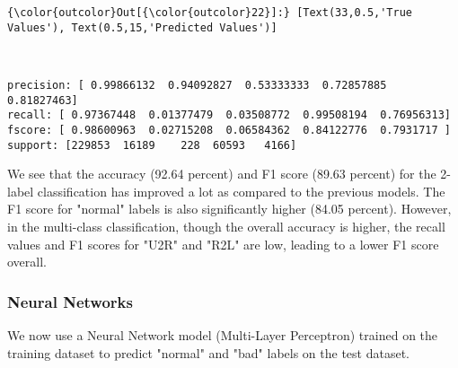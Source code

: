 \documentclass[11pt]{article}
\begin{document}
\begin{Verbatim}[commandchars=\\\{\}]
{\color{outcolor}Out[{\color{outcolor}22}]:} [Text(33,0.5,'True Values'), Text(0.5,15,'Predicted Values')]
\end{Verbatim}
            
    \begin{center}
    \end{center}
    { \hspace*{\fill} \\}
    
    \begin{Verbatim}[commandchars=\\\{\}]
precision: [ 0.99866132  0.94092827  0.53333333  0.72857885  0.81827463]
recall: [ 0.97367448  0.01377479  0.03508772  0.99508194  0.76956313]
fscore: [ 0.98600963  0.02715208  0.06584362  0.84122776  0.7931717 ]
support: [229853  16189    228  60593   4166]

    \end{Verbatim}

    We see that the accuracy (92.64 percent) and F1 score (89.63 percent)
for the 2-label classification has improved a lot as compared to the
previous models. The F1 score for "normal" labels is also significantly
higher (84.05 percent). However, in the multi-class classification,
though the overall accuracy is higher, the recall values and F1 scores
for "U2R" and "R2L" are low, leading to a lower F1 score overall.

    \subsubsection{Neural Networks}\label{neural-networks}

We now use a Neural Network model (Multi-Layer Perceptron) trained on
the training dataset to predict "normal" and "bad" labels on the test
dataset.
\end{document}
